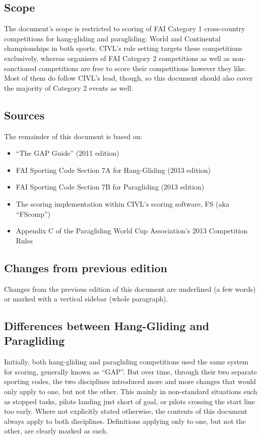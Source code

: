 \documentclass{article}
\begin{document}
\subsection{Scope}
The document’s scope is restricted to scoring of FAI Category 1 cross-country
competitions for hang-gliding and paragliding: World and Continental
championships in both sports. CIVL’s rule setting targets these competitions
exclusively, whereas organisers of FAI Category 2 competitions as well as
non-sanctioned competitions are free to score their competitions however they
like. Most of them do follow CIVL’s lead, though, so this document should also
cover the majority of Category 2 events as well.

\subsection{Sources}
The remainder of this document is based on:
\begin{itemize}
\item “The GAP Guide” (2011 edition)
\item FAI Sporting Code Section 7A for Hang-Gliding (2013 edition)
\item FAI Sporting Code Section 7B for Paragliding (2013 edition)
\item The scoring implementation within CIVL’s scoring software, FS (aka “FScomp”)
\item Appendix C of the Paragliding World Cup Association’s 2013 Competition Rules
\end{itemize}

\subsection{Changes from previous edition}
Changes from the previous edition of this document are underlined (a few words)
or marked with a vertical sidebar (whole paragraph).

\subsection{Differences between Hang-Gliding and Paragliding}
Initially, both hang-gliding and paragliding competitions used the same system
for scoring, generally known as “GAP”. But over time, through their two
separate sporting codes, the two disciplines introduced more and more changes
that would only apply to one, but not the other. This mainly in non-standard
situations such as stopped tasks, pilots landing just short of goal, or pilots
crossing the start line too early. Where not explicitly stated otherwise, the
contents of this document always apply to both disciplines. Definitions
applying only to one, but not the other, are clearly marked as such.
\end{document}
